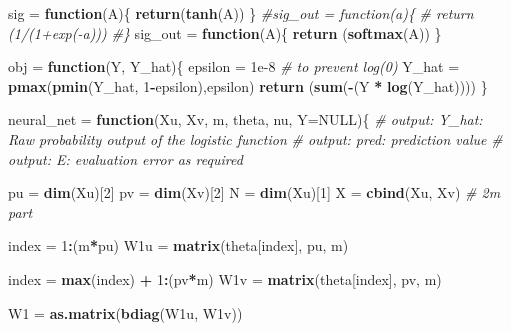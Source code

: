 \documentclass[12pt,halfline,a4paper,]{ouparticle}
\newenvironment{Shaded}{\begin{snugshade}}{\end{snugshade}}
\newcommand{\AttributeTok}[1]{\textcolor[rgb]{0.13,0.29,0.53}{#1}}
\newcommand{\CommentTok}[1]{\textcolor[rgb]{0.56,0.35,0.01}{\textit{#1}}}
\newcommand{\ConstantTok}[1]{\textcolor[rgb]{0.56,0.35,0.01}{#1}}
\newcommand{\ControlFlowTok}[1]{\textcolor[rgb]{0.13,0.29,0.53}{\textbf{#1}}}
\newcommand{\DecValTok}[1]{\textcolor[rgb]{0.00,0.00,0.81}{#1}}
\newcommand{\FloatTok}[1]{\textcolor[rgb]{0.00,0.00,0.81}{#1}}
\newcommand{\FunctionTok}[1]{\textcolor[rgb]{0.13,0.29,0.53}{\textbf{#1}}}
\newcommand{\NormalTok}[1]{#1}
\newcommand{\OtherTok}[1]{\textcolor[rgb]{0.56,0.35,0.01}{#1}}
\newcommand{\SpecialCharTok}[1]{\textcolor[rgb]{0.81,0.36,0.00}{\textbf{#1}}}
\begin{document}
\begin{Shaded}
\begin{Highlighting}[]
\NormalTok{sig }\OtherTok{=} \ControlFlowTok{function}\NormalTok{(A)\{}
  \FunctionTok{return}\NormalTok{(}\FunctionTok{tanh}\NormalTok{(A))}
\NormalTok{\}}
\CommentTok{\#sig\_out = function(a)\{}
\CommentTok{\#  return (1/(1+exp({-}a)))}
\CommentTok{\#\}}
\NormalTok{sig\_out }\OtherTok{=} \ControlFlowTok{function}\NormalTok{(A)\{}
  \FunctionTok{return}\NormalTok{ (}\FunctionTok{softmax}\NormalTok{(A))}
\NormalTok{\}}

\NormalTok{obj }\OtherTok{=} \ControlFlowTok{function}\NormalTok{(Y, Y\_hat)\{}
\NormalTok{  epsilon }\OtherTok{=} \FloatTok{1e{-}8} \CommentTok{\# to prevent log(0)}
\NormalTok{  Y\_hat }\OtherTok{=} \FunctionTok{pmax}\NormalTok{(}\FunctionTok{pmin}\NormalTok{(Y\_hat, }\DecValTok{1}\SpecialCharTok{{-}}\NormalTok{epsilon),epsilon)}
  \FunctionTok{return}\NormalTok{ (}\FunctionTok{sum}\NormalTok{(}\SpecialCharTok{{-}}\NormalTok{(Y }\SpecialCharTok{*} \FunctionTok{log}\NormalTok{(Y\_hat))))}
\NormalTok{\}}

\NormalTok{neural\_net }\OtherTok{=} \ControlFlowTok{function}\NormalTok{(Xu, Xv, m, theta, nu, }\AttributeTok{Y=}\ConstantTok{NULL}\NormalTok{)\{}
  \CommentTok{\# output: Y\_hat: Raw probability output of the logistic function}
  \CommentTok{\# output: pred: prediction value}
  \CommentTok{\# output: E: evaluation error as required}
  
\NormalTok{  pu }\OtherTok{=} \FunctionTok{dim}\NormalTok{(Xu)[}\DecValTok{2}\NormalTok{]}
\NormalTok{  pv }\OtherTok{=} \FunctionTok{dim}\NormalTok{(Xv)[}\DecValTok{2}\NormalTok{]}
\NormalTok{  N }\OtherTok{=} \FunctionTok{dim}\NormalTok{(Xu)[}\DecValTok{1}\NormalTok{]}
\NormalTok{  X }\OtherTok{=} \FunctionTok{cbind}\NormalTok{(Xu, Xv)}
  \CommentTok{\# 2m part}
  
\NormalTok{  index }\OtherTok{=} \DecValTok{1}\SpecialCharTok{:}\NormalTok{(m}\SpecialCharTok{*}\NormalTok{pu)}
\NormalTok{  W1u }\OtherTok{=} \FunctionTok{matrix}\NormalTok{(theta[index], pu, m)}

\NormalTok{  index }\OtherTok{=} \FunctionTok{max}\NormalTok{(index) }\SpecialCharTok{+} \DecValTok{1}\SpecialCharTok{:}\NormalTok{(pv}\SpecialCharTok{*}\NormalTok{m)}
\NormalTok{  W1v }\OtherTok{=} \FunctionTok{matrix}\NormalTok{(theta[index], pv, m)}

\NormalTok{  W1 }\OtherTok{=} \FunctionTok{as.matrix}\NormalTok{(}\FunctionTok{bdiag}\NormalTok{(W1u, W1v))}


\end{Highlighting}
\end{Shaded}
\end{document}
